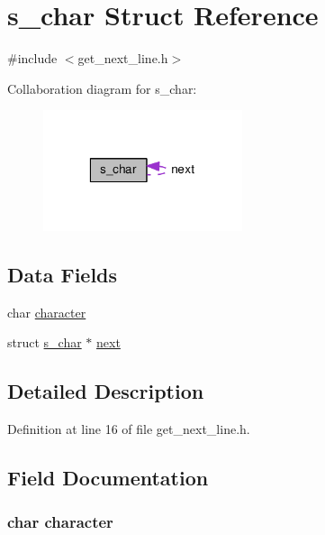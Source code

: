 \hypertarget{structs__char}{\section{s\-\_\-char Struct Reference}
\label{structs__char}
}


{\ttfamily \#include $<$get\-\_\-next\-\_\-line.\-h$>$}



Collaboration diagram for s\-\_\-char\-:\nopagebreak
\begin{figure}[H]
\begin{center}
\leavevmode
\includegraphics[width=166pt]{de/d73/structs__char__coll__graph}
\end{center}
\end{figure}
\subsection*{Data Fields}
\begin{DoxyCompactItemize}
\item 
char \hyperlink{structs__char_ac6027d2dbb9ac08b3b6729341c0bcf8f}{character}
\item 
struct \hyperlink{structs__char}{s\-\_\-char} $\ast$ \hyperlink{structs__char_a948ac1df44de106ac471ed05df56482c}{next}
\end{DoxyCompactItemize}


\subsection{Detailed Description}


Definition at line 16 of file get\-\_\-next\-\_\-line.\-h.



\subsection{Field Documentation}
\hypertarget{structs__char_ac6027d2dbb9ac08b3b6729341c0bcf8f}{
\subsubsection[{character}]{\setlength{\rightskip}{0pt plus 5cm}char character}}\label{structs__char_ac6027d2dbb9ac08b3b6729341c0bcf8f}


